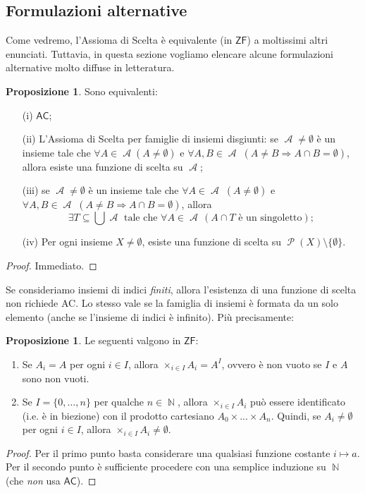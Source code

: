\documentclass[12pt,a4paper]{report}
\theoremstyle{definition}
\newtheorem{prop}[teo]{Proposizione}  %
\theoremstyle{num.custom-title}
\DeclareMathOperator{\A}{\mathcal{A}}
\DeclareMathOperator{\PP}{\mathcal{P}}
\DeclareMathOperator{\N}{\mathbb{N}}
\DeclareMathOperator{\imp}{\Rightarrow}
\DeclareMathOperator{\sm}{\setminus}
\newcommand{\AC}{\ensuremath{\mathsf{AC}}\xspace}
\newcommand{\ZF}{\ensuremath{\mathsf{ZF}}\xspace}
\begin{document}
\subsection{Formulazioni alternative}

Come vedremo, l'Assioma di Scelta è equivalente (in \ZF) a moltissimi altri enunciati. Tuttavia, in questa sezione vogliamo elencare alcune formulazioni alternative molto diffuse in letteratura.

\begin{prop}\label{formulazioniequiv}
Sono equivalenti:
\begin{itemize}
\item[(i)] \AC;
\item[(ii)] L'Assioma di Scelta per famiglie di insiemi disgiunti: se $\A \neq \emptyset$ è un insieme tale che $\forall A \in \A (A \neq \emptyset)$ e $\forall A,B \in \A \; (A \neq B \imp A \cap B = \emptyset)$, allora esiste una funzione di scelta su $\A$;
\item[(iii)] se $\A \neq \emptyset$ è un insieme tale che $\forall A \in \A \; (A \neq \emptyset)$ e $\forall A,B \in \A \; (A \neq B \imp A \cap B = \emptyset)$, allora 
\[
\exists T \subseteq \bigcup \A \text{ tale che } \forall A \in \A \, (A \cap T \text{ è un singoletto});
\]
\item[(iv)] Per ogni insieme $X \neq \emptyset$, esiste una funzione di scelta su $\PP(X) \sm \{\emptyset\}$.
\end{itemize}
\begin{proof}
Immediato.
\end{proof}
\end{prop}

Se consideriamo insiemi di indici \emph{finiti}, allora l'esistenza di una funzione di scelta non richiede AC. Lo stesso vale se la famiglia di insiemi è formata da un solo elemento (anche se l'insieme di indici è infinito). Più precisamente:

\begin{prop} Le seguenti valgono in \ZF:

\begin{enumerate}
\item Se $A_i = A$ per ogni $i \in I$, allora $\times_{i \in I} A_i = A^I$, ovvero è non vuoto se $I$ e $A$ sono non vuoti.
\item Se $I=\{0,...,n\}$ per qualche $n \in \N$, allora $\times_{i \in I} A_i$ può essere identificato (i.e. è in biezione) con il prodotto cartesiano $A_0 \times ... \times A_n$. Quindi, se $A_i \neq \emptyset$ per ogni $i \in I$, allora $\times_{i \in I} A_i \neq \emptyset$.
\end{enumerate}

\begin{proof}
Per il primo punto basta considerare una qualsiasi funzione costante $i \mapsto a$. Per il secondo punto è sufficiente procedere con una semplice induzione su $\N$ (che \emph{non} usa \AC).
\end{proof}
\end{prop}
\end{document}
